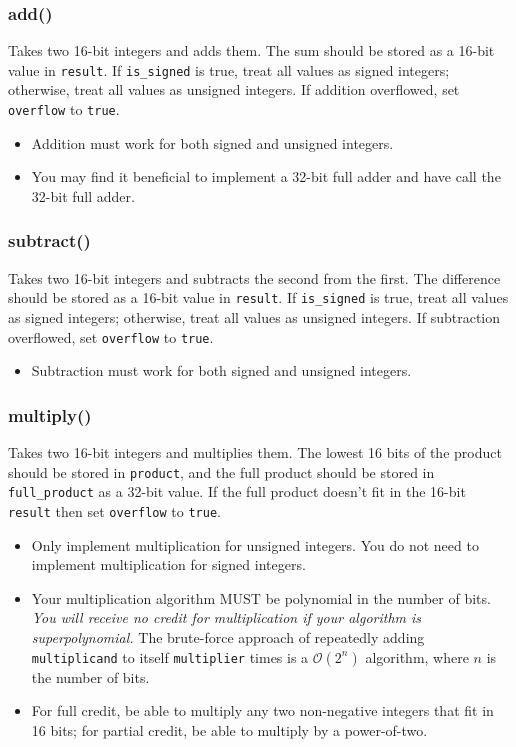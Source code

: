 \subsubsection*{add()} Takes two 16-bit integers and adds them.  The sum should
be stored as a 16-bit value in \lstinline{result}.  If \lstinline{is_signed}
is true, treat all values as signed integers; otherwise, treat all values as
unsigned integers.  If addition overflowed, set \lstinline{overflow} to
\lstinline{true}.
\begin{itemize}
\item Addition must work for both signed and unsigned integers.
\item You may find it beneficial to implement a 32-bit full adder and have
     call the 32-bit full adder.
\end{itemize}

\subsubsection*{subtract()} Takes two 16-bit integers and subtracts the second
from the first.  The difference should be stored as a 16-bit value in
\lstinline{result}.  If \lstinline{is_signed} is true, treat all values as
signed integers; otherwise, treat all values as unsigned integers.  If
subtraction overflowed, set \lstinline{overflow} to \lstinline{true}.
\begin{itemize}
\item Subtraction must work for both signed and unsigned integers.
\end{itemize}

\subsubsection*{multiply()} Takes two 16-bit integers and multiplies them.  The
lowest 16 bits of the product should be stored in \lstinline{product}, and the
full product should be stored in \lstinline{full_product} as a 32-bit value.
If the full product doesn't fit in the 16-bit \lstinline{result} then set
\lstinline{overflow} to \lstinline{true}.
\begin{itemize}
\item Only implement multiplication for unsigned integers.  You do not need to
    implement multiplication for signed integers.
\item Your multiplication algorithm MUST be polynomial in the number of bits.
    \textit{You will receive no credit for multiplication if your algorithm is
    superpolynomial.} The brute-force approach of repeatedly adding
    \lstinline{multiplicand} to itself \lstinline{multiplier} times is a
    $\mathcal{O}(2^n)$ algorithm, where $n$ is the number of bits.
\item For full credit, be able to multiply any two non-negative integers that
    fit in 16 bits; for partial credit, be able to multiply by a power-of-two.
\end{itemize}

